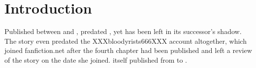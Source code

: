 \cleardoublepage\chapter{Introduction}


\begin{sloppypar}
	Published between  and ,
	 predated , yet has been left in its successor's shadow.
	The story even predated the XXXbloodyrists666XXX account altogether,
	which joined fanfiction.net after the fourth chapter had been
	published and left a review of the story on the date she joined.
	itself published from  to .
\end{sloppypar}

\lipsum[2-12]